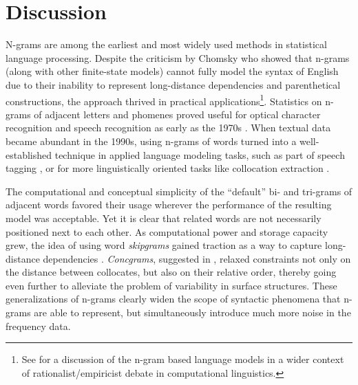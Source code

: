 \documentclass[12pt]{article}
\begin{document}



\section{Discussion}
\label{sec:discuss}

N-grams are among the earliest and most widely used methods in
statistical language processing.  Despite the criticism by Chomsky
\autocite{chomsky1956three} who showed that n-grams (along with other
finite-state models) cannot fully model the syntax of English due to
their inability to represent long-distance dependencies and
parenthetical constructions, the approach thrived in practical
applications\footnote{See \textcite{church2011pendulum} for a
  discussion of the n-gram based language models in a wider context of
  rationalist/empiricist debate in computational
  linguistics.}. Statistics on n-grams of adjacent letters and
phomenes proved useful for optical character recognition and speech
recognition as early as the 1970s
\autocite{robertson1998applications}. When textual data became
abundant in the 1990s, using n-grams of words turned into a
well-established technique in applied language modeling tasks, such as
part of speech tagging \autocite{schmid1999improvements}, or for more
linguistically oriented tasks like collocation extraction
\autocite{manning1999foundations}.


The computational and conceptual simplicity of the “default” bi- and
tri-grams of adjacent words favored their usage wherever the
performance of the resulting model was acceptable. Yet it is clear
that related words are not necessarily positioned next to each
other. As computational power and storage capacity grew, the idea of
using word \textit{skipgrams} gained traction as a way to capture
long-distance dependencies
\autocite{guthrie-etal-2006-closer}. \textit{Concgrams}, suggested in
\cite{cheng2006concgrams}, relaxed constraints not only on the
distance between collocates, but also on their relative order, thereby
going even further to alleviate the problem of variability in surface
structures. These generalizations of n-grams clearly widen the scope
of syntactic phenomena that n-grams are able to represent, but
simultaneously introduce much more noise in the frequency data.
\end{document}
